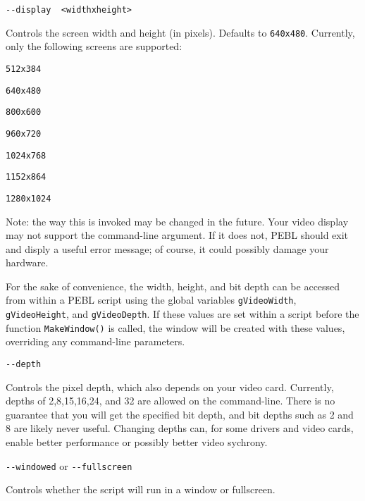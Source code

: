 \begin{description}
\item
\begin{verbatim}
--display  <widthxheight>
\end{verbatim}
  Controls the screen width and height (in pixels). Defaults
  to \texttt{640x480}.
  Currently, only the following screens are supported:
\begin{description}
\item
\begin{verbatim}
512x384
\end{verbatim}
\item
\begin{verbatim}
640x480
\end{verbatim}
\item
\begin{verbatim}
800x600
\end{verbatim}
\item
\begin{verbatim}
960x720
\end{verbatim}
\item
\begin{verbatim}
1024x768
\end{verbatim}
\item
\begin{verbatim}
1152x864
\end{verbatim}
\item
\begin{verbatim}
1280x1024
\end{verbatim}
\end{description}

Note: the way this is invoked may be changed in the
future.  Your video display may not support the
command-line argument.  If it does not, PEBL should exit
and disply a useful error message; of course, it could
possibly damage your hardware. 


For the sake of convenience, the width, height, and bit depth can be
accessed from within a PEBL script using the global variables
\texttt{gVideoWidth}, \texttt{gVideoHeight}, and \texttt{gVideoDepth}.
If these values are set within a script before the function
\verb+MakeWindow()+ is called,  the window will be created with these values,
overriding any command-line parameters.
  
\item
\begin{verbatim}
--depth
\end{verbatim}
  Controls the pixel depth, which also  depends on your video card.
  Currently, depths of 2,8,15,16,24, and 32 are allowed on the
  command-line.  There is no guarantee that you will get the
  specified bit depth, and bit depths such as 2 and 8 are
  likely never useful.  Changing depths can, for
  some drivers and video cards, enable better performance or
  possibly better video sychrony.

\item
\verb+--windowed+ or \verb+--fullscreen+

Controls whether the script will run in a window or fullscreen.  
\end{description}



